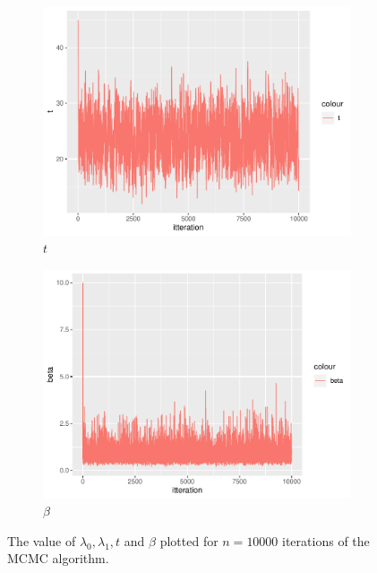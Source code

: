 \begin{figure}
\begin{subfigure}[b]{0.49\textwidth}
        \includegraphics[width = \textwidth]{Images/sim_t.pdf}
        \caption{$t$}
        \label{fig:burnin_t}
    \end{subfigure}
    \begin{subfigure}[b]{0.49\textwidth}
        \centering
        \includegraphics[width = \textwidth]{Images/sim_beta.pdf}
        \caption{$\beta$}
        \label{fig:burnin_beta}
    \end{subfigure}
    \caption{The value of $\lambda_0, \lambda_1, t$ and $\beta$ plotted for $n = 10000$ iterations of the MCMC algorithm.}
    \label{fig:burnin_singleMH}
\end{figure}

